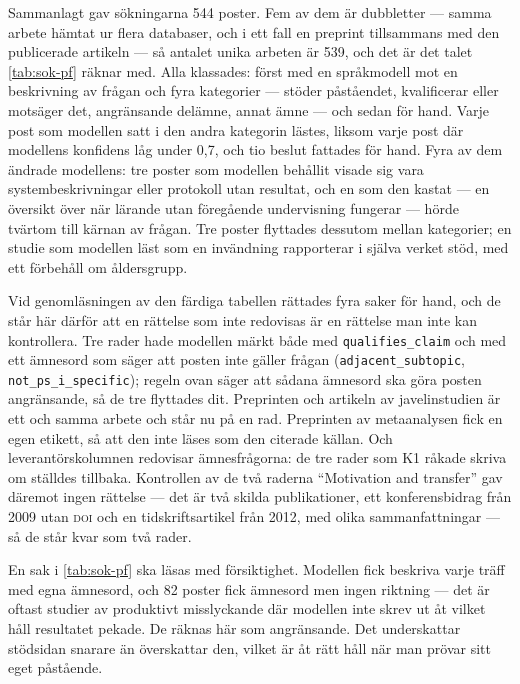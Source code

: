Sammanlagt gav sökningarna 544 poster.  Fem av dem är dubbletter --- samma
arbete hämtat ur flera databaser, och i ett fall en preprint tillsammans med
den publicerade artikeln --- så antalet unika arbeten är 539, och det är det
talet \cref{tab:sok-pf} räknar med.  Alla klassades: först med en
språkmodell mot en beskrivning av frågan och fyra kategorier --- stöder
påståendet, kvalificerar eller motsäger det, angränsande delämne, annat ämne
--- och sedan för hand.  Varje post som modellen satt i den andra kategorin
lästes, liksom varje post där modellens konfidens låg under 0,7, och tio
beslut fattades för hand.  Fyra av dem ändrade modellens: tre poster som
modellen behållit visade sig vara systembeskrivningar eller protokoll utan
resultat, och en som den kastat --- en översikt över när lärande utan
föregående undervisning fungerar --- hörde tvärtom till kärnan av frågan.
Tre poster flyttades dessutom mellan kategorier; en studie som modellen läst
som en invändning rapporterar i själva verket stöd, med ett förbehåll om
åldersgrupp.

Vid genomläsningen av den färdiga tabellen rättades fyra saker för hand, och
de står här därför att en rättelse som inte redovisas är en rättelse man
inte kan kontrollera.  Tre rader hade modellen märkt både med
\texttt{qualifies\_claim} och med ett ämnesord som säger att posten inte
gäller frågan (\texttt{adjacent\_subtopic}, \texttt{not\_ps\_i\_specific});
regeln ovan säger att sådana ämnesord ska göra posten angränsande, så de
tre flyttades dit.  Preprinten och artikeln av javelinstudien är ett och
samma arbete och står nu på en rad.  Preprinten av metaanalysen fick en egen
etikett, så att den inte läses som den citerade källan.  Och
leverantörskolumnen redovisar ämnesfrågorna: de tre rader som K1 råkade
skriva om ställdes tillbaka.  Kontrollen av de två raderna
\enquote{Motivation and transfer} gav däremot ingen rättelse --- det är två
skilda publikationer, ett konferensbidrag från 2009 utan \textsc{doi} och en
tidskriftsartikel från 2012, med olika sammanfattningar --- så de står kvar
som två rader.

En sak i \cref{tab:sok-pf} ska läsas med försiktighet.  Modellen fick
beskriva varje träff med egna ämnesord, och 82 poster fick ämnesord men
ingen riktning --- det är oftast studier av produktivt misslyckande där
modellen inte skrev ut åt vilket håll resultatet pekade.  De räknas här som
angränsande.  Det underskattar stödsidan snarare än överskattar den, vilket
är åt rätt håll när man prövar sitt eget påstående.

